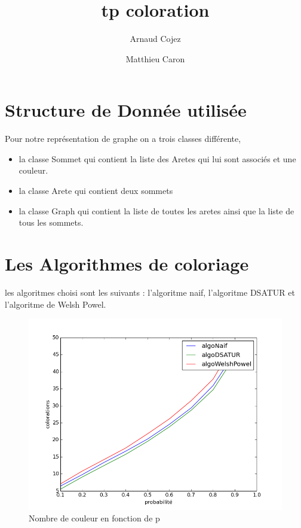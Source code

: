 \documentclass[a4paper,10pt]{report}
\title{tp coloration}
\author{Arnaud Cojez \and Matthieu Caron}
\begin{document}
\maketitle

\section{Structure de Donnée utilisée}
Pour notre représentation de graphe on a trois classes différente,
\begin{itemize}
 \item la classe Sommet qui contient la liste des Aretes qui lui sont associés et une couleur.
 \item la classe Arete qui contient deux sommets
 \item la classe Graph qui contient la liste de toutes les aretes ainsi que la liste de tous les sommets.
\end{itemize}

\section{Les Algorithmes de coloriage}
les algoritmes choisi sont les suivants : l'algoritme naif, l'algoritme DSATUR et l'algoritme de Welsh Powel.

\begin{center}
  \begin{figure}[h]
    \label{color}
    \includegraphics[scale=0.5]{coloration.png}
    \caption{Nombre de couleur en fonction de p}
  \end{figure} 
\end{center}
\end{document}
